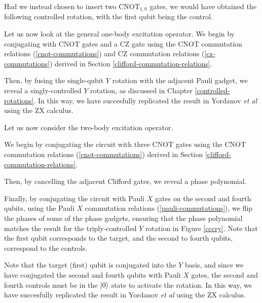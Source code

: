 
Had we instead chosen to insert two $\text{CNOT}_{1, 0}$ gates, we would have obtained the following controlled rotation, with the first qubit being the control.


Let us now look at the general one-body excitation operator. We begin by conjugating with CNOT gates and a CZ gate using the CNOT commutation relations (\ref{cnot-commutations}) and CZ commutation relations (\ref{cz-commutations}) derived in Section \ref{clifford-commutation-relations}.


Then, by fusing the single-qubit $Y$ rotation with the adjacent Pauli gadget, we reveal a singly-controlled $Y$ rotation, as discussed in Chapter \ref{controlled-rotations}. In this way, we have succesfully replicated the result in Yordanov \textit{et al} \cite{Yordanov2020} using the ZX calculus.


Let us now consider the two-body excitation operator.


We begin by conjugating the circuit with three CNOT gates using the CNOT commutation relations (\ref{cnot-commutations}) derived in Section \ref{clifford-commutation-relations}.


Then, by cancelling the adjacent Clifford gates, we reveal a phase polynomial.


Finally, by conjugating the circuit with Pauli $X$ gates on the second and fourth qubits, using the Pauli $X$ commutation relations (\ref{pauli-commutations}), we flip the phases of some of the phase gadgets, ensuring that the phase polynomial matches the result for the triply-controlled $Y$ rotation in Figure \ref{cccry}. Note that the first qubit corresponds to the target, and the second to fourth qubits, correspond to the controls.


Note that the target (first) qubit is conjugated into the $Y$ basis, and since we have conjugated the second and fourth qubits with Pauli $X$ gates, the second and fourth controls must be in the $\ket 0$ state to activate the rotation. In this way, we have succesfully replicated the result in Yordanov \textit{et al} \cite{Yordanov2020} using the ZX calculus.

